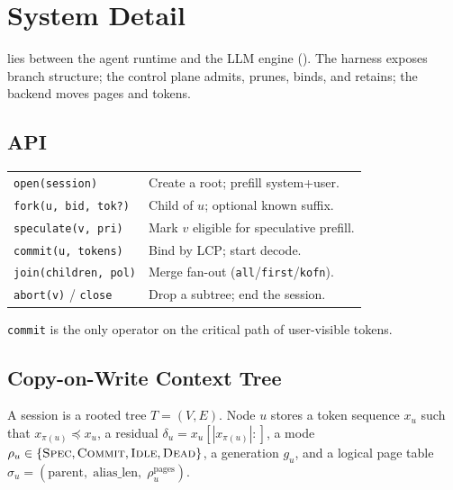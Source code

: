 \section{System Detail}
\label{sec:design-full}

\sys lies between the agent runtime and the LLM engine ().
The harness exposes branch structure; the control plane admits, prunes, binds, and retains; the backend moves pages and tokens.

\subsection{API}
\label{sec:overview}
\begin{center}
\footnotesize
\setlength{\tabcolsep}{3pt}
\begin{tabular}{@{}lp{}@{}}
\toprule
\texttt{open(session)} & Create a root; prefill system+user. \\
\texttt{fork(u, bid, tok?)} & Child of $u$; optional known suffix. \\
\texttt{speculate(v, pri)} & Mark $v$ eligible for speculative prefill. \\
\texttt{commit(u, tokens)} & Bind by LCP; start decode. \\
\texttt{join(children, pol)} & Merge fan-out (\texttt{all}/\texttt{first}/\texttt{kofn}). \\
\texttt{abort(v)} / \texttt{close} & Drop a subtree; end the session. \\
\bottomrule
\end{tabular}
\end{center}
\texttt{commit} is the only operator on the critical path of user-visible tokens.

\subsection{Copy-on-Write Context Tree}
\label{sec:state}

\begin{definition}
A session is a rooted tree $T=(V,E)$.
Node $u$ stores a token sequence $x_u$ such that $x_{\pi(u)}\preceq x_u$, a residual $\delta_u=x_u[|x_{\pi(u)}|{:}]$, a mode $\rho_u\in\{\textsc{Spec},\textsc{Commit},\textsc{Idle},\textsc{Dead}\}$, a generation $g_u$, and a logical page table
$\sigma_u=(\mathrm{parent},\;\mathrm{alias\_len},\;\rho^{\mathrm{pages}}_u)$.
\end{definition}

